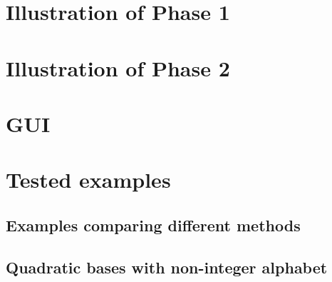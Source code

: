 \section{Illustration of Phase 1}
\section{Illustration of Phase 2}

\section{GUI}
\section{Tested examples}

\subsection*{Examples comparing different methods}



\subsection*{Quadratic bases with non-integer alphabet}


%
%
%